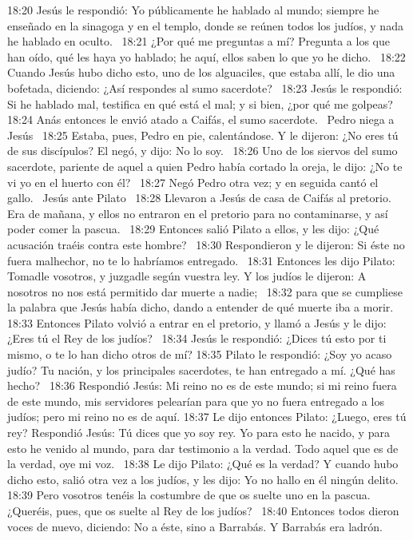 18:20 Jesús le respondió: Yo públicamente he hablado al mundo; siempre he enseñado en la sinagoga y en el templo, donde se reúnen todos los judíos, y nada he hablado en oculto.  
18:21 ¿Por qué me preguntas a mí? Pregunta a los que han oído, qué les haya yo hablado; he aquí, ellos saben lo que yo he dicho.  
18:22 Cuando Jesús hubo dicho esto, uno de los alguaciles, que estaba allí, le dio una bofetada, diciendo: ¿Así respondes al sumo sacerdote?  
18:23 Jesús le respondió: Si he hablado mal, testifica en qué está el mal; y si bien, ¿por qué me golpeas? 
18:24 Anás entonces le envió atado a Caifás, el sumo sacerdote.  
Pedro niega a Jesús   
18:25 Estaba, pues, Pedro en pie, calentándose. Y le dijeron: ¿No eres tú de sus discípulos? El negó, y dijo: No lo soy.  
18:26 Uno de los siervos del sumo sacerdote, pariente de aquel a quien Pedro había cortado la oreja, le dijo: ¿No te vi yo en el huerto con él?  
18:27 Negó Pedro otra vez; y en seguida cantó el gallo.  
Jesús ante Pilato   
18:28 Llevaron a Jesús de casa de Caifás al pretorio. Era de mañana, y ellos no entraron en el pretorio para no contaminarse, y así poder comer la pascua.  
18:29 Entonces salió Pilato a ellos, y les dijo: ¿Qué acusación traéis contra este hombre?  
18:30 Respondieron y le dijeron: Si éste no fuera malhechor, no te lo habríamos entregado.  
18:31 Entonces les dijo Pilato: Tomadle vosotros, y juzgadle según vuestra ley. Y los judíos le dijeron: A nosotros no nos está permitido dar muerte a nadie;  
18:32 para que se cumpliese la palabra que Jesús había dicho, dando a entender de qué muerte iba a morir. 
18:33 Entonces Pilato volvió a entrar en el pretorio, y llamó a Jesús y le dijo: ¿Eres tú el Rey de los judíos?  
18:34 Jesús le respondió: ¿Dices tú esto por ti mismo, o te lo han dicho otros de mí? 
18:35 Pilato le respondió: ¿Soy yo acaso judío? Tu nación, y los principales sacerdotes, te han entregado a mí. ¿Qué has hecho?  
18:36 Respondió Jesús: Mi reino no es de este mundo; si mi reino fuera de este mundo, mis servidores pelearían para que yo no fuera entregado a los judíos; pero mi reino no es de aquí. 
18:37 Le dijo entonces Pilato: ¿Luego, eres tú rey? Respondió Jesús: Tú dices que yo soy rey. Yo para esto he nacido, y para esto he venido al mundo, para dar testimonio a la verdad. Todo aquel que es de la verdad, oye mi voz.  
18:38 Le dijo Pilato: ¿Qué es la verdad? Y cuando hubo dicho esto, salió otra vez a los judíos, y les dijo: Yo no hallo en él ningún delito.  
18:39 Pero vosotros tenéis la costumbre de que os suelte uno en la pascua. ¿Queréis, pues, que os suelte al Rey de los judíos?  
18:40 Entonces todos dieron voces de nuevo, diciendo: No a éste, sino a Barrabás. Y Barrabás era ladrón.  

